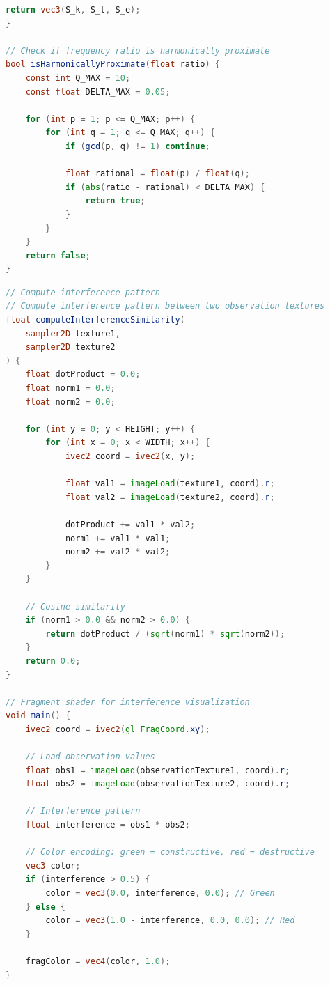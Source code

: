 \documentclass[11pt,a4paper]{article}
\theoremstyle{definition}
\theoremstyle{remark}
\begin{document}
\begin{lstlisting}[language=GLSL,caption={Observation Texture Generation}]
    return vec3(S_k, S_t, S_e);
}

// Check if frequency ratio is harmonically proximate
bool isHarmonicallyProximate(float ratio) {
    const int Q_MAX = 10;
    const float DELTA_MAX = 0.05;
    
    for (int p = 1; p <= Q_MAX; p++) {
        for (int q = 1; q <= Q_MAX; q++) {
            if (gcd(p, q) != 1) continue;
            
            float rational = float(p) / float(q);
            if (abs(ratio - rational) < DELTA_MAX) {
                return true;
            }
        }
    }
    return false;
}
\end{lstlisting}

\begin{lstlisting}[language=GLSL,caption={Interference Pattern Computation}]
// Compute interference pattern
// Compute interference pattern between two observation textures
float computeInterferenceSimilarity(
    sampler2D texture1,
    sampler2D texture2
) {
    float dotProduct = 0.0;
    float norm1 = 0.0;
    float norm2 = 0.0;
    
    for (int y = 0; y < HEIGHT; y++) {
        for (int x = 0; x < WIDTH; x++) {
            ivec2 coord = ivec2(x, y);
            
            float val1 = imageLoad(texture1, coord).r;
            float val2 = imageLoad(texture2, coord).r;
            
            dotProduct += val1 * val2;
            norm1 += val1 * val1;
            norm2 += val2 * val2;
        }
    }
    
    // Cosine similarity
    if (norm1 > 0.0 && norm2 > 0.0) {
        return dotProduct / (sqrt(norm1) * sqrt(norm2));
    }
    return 0.0;
}

// Fragment shader for interference visualization
void main() {
    ivec2 coord = ivec2(gl_FragCoord.xy);
    
    // Load observation values
    float obs1 = imageLoad(observationTexture1, coord).r;
    float obs2 = imageLoad(observationTexture2, coord).r;
    
    // Interference pattern
    float interference = obs1 * obs2;
    
    // Color encoding: green = constructive, red = destructive
    vec3 color;
    if (interference > 0.5) {
        color = vec3(0.0, interference, 0.0); // Green
    } else {
        color = vec3(1.0 - interference, 0.0, 0.0); // Red
    }
    
    fragColor = vec4(color, 1.0);
}
\end{lstlisting}
\end{document}
